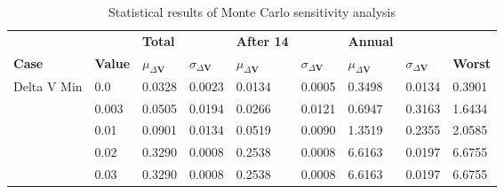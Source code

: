 \begin{table}[H]
\centering
\begin{tabular}{lllllllll}
 &  & \cellcolor[HTML]{EFEFEF}\textbf{Total} &  & \cellcolor[HTML]{EFEFEF}\textbf{After 14} & & \cellcolor[HTML]{EFEFEF}\textbf{Annual} & &\\
\rowcolor[HTML]{EFEFEF} 
\textbf{Case} & \textbf{Value} & \textbf{$\mu_{\Delta \boldsymbol{V}}$} & \textbf{$\sigma_{\Delta \boldsymbol{V}}$} & \textbf{$\mu_{\Delta \boldsymbol{V}}$} & \textbf{$\sigma_{\Delta \boldsymbol{V}}$} & \textbf{$\mu_{\Delta \boldsymbol{V}}$} & \textbf{$\sigma_{\Delta \boldsymbol{V}}$} & \textbf{Worst} \\ 
Delta V Min & 0.0 & 0.0328 & 0.0023 & 0.0134 & 0.0005 & 0.3498 & 0.0134 & 0.3901 \\ 
 & 0.003 & 0.0505 & 0.0194 & 0.0266 & 0.0121 & 0.6947 & 0.3163 & 1.6434 \\ 
 & 0.01 & 0.0901 & 0.0134 & 0.0519 & 0.0090 & 1.3519 & 0.2355 & 2.0585 \\ 
 & 0.02 & 0.3290 & 0.0008 & 0.2538 & 0.0008 & 6.6163 & 0.0197 & 6.6755 \\ 
 & 0.03 & 0.3290 & 0.0008 & 0.2538 & 0.0008 & 6.6163 & 0.0197 & 6.6755 \\ 
\end{tabular}
\caption{Statistical results of Monte Carlo sensitivity analysis}
\label{tab:SensitivityAnalysis}
\end{table}